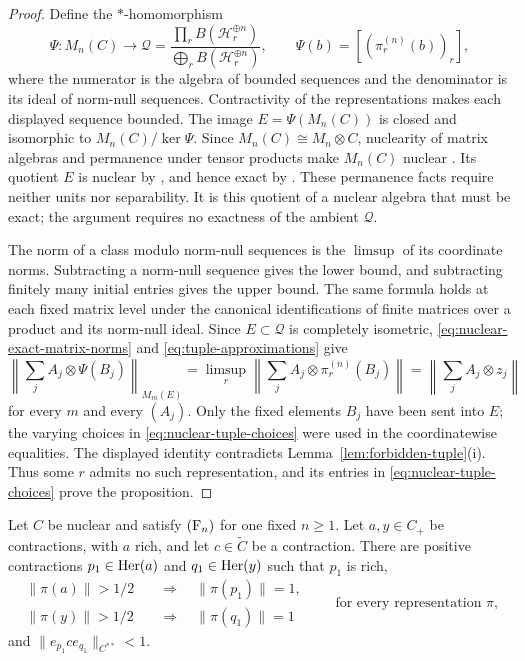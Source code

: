 \begin{proof}
Define the \(*\)-homomorphism
\[
 \Psi:M_n(C)\longrightarrow
 \mathcal Q=
 \frac{\prod_r B(\mathcal H_r^{\oplus n})}
      {\bigoplus_r B(\mathcal H_r^{\oplus n})},
 \qquad
 \Psi(b)=[(\pi_r^{(n)}(b))_r],
\]
where the numerator is the algebra of bounded sequences and the
denominator is its ideal of norm-null sequences.  Contractivity of
the representations makes each displayed sequence bounded.  The
image \(E=\Psi(M_n(C))\) is closed and isomorphic to
\(M_n(C)/\ker\Psi\).  Since \(M_n(C)\cong M_n\otimes C\), nuclearity
of matrix algebras and permanence under tensor products make
\(M_n(C)\) nuclear \cite[II.9.4.2 and IV.3.1.1]{Blackadar}.
Its quotient \(E\) is nuclear by
\cite[Corollary~4]{ChoiEffros1977}, and hence exact by
\cite[II.9.6.6]{Blackadar}.
These permanence facts require neither units nor separability.
It is this quotient of a nuclear algebra that must be exact; the
argument requires no exactness of the ambient \(\mathcal Q\).

The norm of a class modulo norm-null sequences is the \(\limsup\) of
its coordinate norms.  Subtracting a norm-null sequence gives the
lower bound, and subtracting finitely many initial entries gives the
upper bound.  The same formula holds at each fixed matrix level under
the canonical identifications of finite matrices over a product and
its norm-null ideal.  Since \(E\subset\mathcal Q\) is completely
isometric, \eqref{eq:nuclear-exact-matrix-norms} and
\eqref{eq:tuple-approximations} give
\[
 \left\|\sum_j A_j\otimes\Psi(B_j)\right\|_{M_m(E)}
 =\limsup_r\left\|\sum_j A_j\otimes\pi_r^{(n)}(B_j)\right\|
 =\left\|\sum_j A_j\otimes z_j\right\|
\]
for every \(m\) and every \((A_j)\).  Only the fixed elements
\(B_j\) have been sent into \(E\); the varying choices in
\eqref{eq:nuclear-tuple-choices} were used in the coordinatewise
equalities.  The displayed identity contradicts
Lemma~\ref{lem:forbidden-tuple}(i).  Thus some \(r\) admits no such
representation, and its entries in
\eqref{eq:nuclear-tuple-choices} prove the proposition.
\end{proof}

\begin{proposition}
\label{prop:shrinking-nuclear}
Let \(C\) be nuclear and satisfy \(\textup{(F\ensuremath{_n})}\) for one fixed \(n\ge1\).
Let \(a,y\in C_+\) be contractions, with \(a\) rich, and let
\(c\in\widetilde C\) be a contraction.  There are positive
contractions \(p_1\in\operatorname{Her}(a)\) and \(q_1\in\operatorname{Her}(y)\) such that
\(p_1\) is rich,
\begin{equation}\label{eq:nuclear-shrinking-signals}
 \begin{split}
 \|\pi(a)\|>1/2&\quad\Longrightarrow\quad\|\pi(p_1)\|=1,\\
 \|\pi(y)\|>1/2&\quad\Longrightarrow\quad\|\pi(q_1)\|=1
 \end{split}
 \qquad\text{for every representation }\pi,
\end{equation}
and \(\|e_{p_1}ce_{q_1}\|_{C^{**}}<1\).
\end{proposition}

